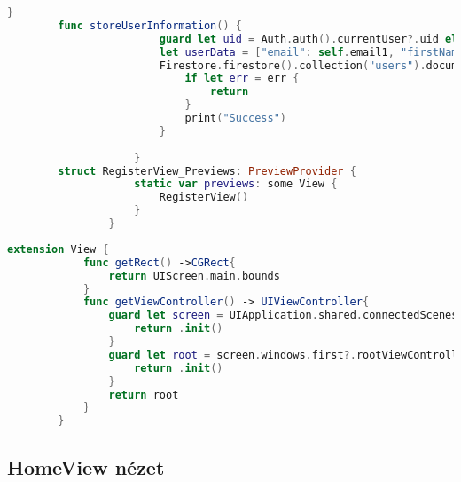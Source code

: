 \begin{minipage}{\textwidth}
\begin{lstlisting}[language=swift]
                            }
        func storeUserInformation() {
                        guard let uid = Auth.auth().currentUser?.uid else {return}
                        let userData = ["email": self.email1, "firstName": self.firstName1, "lastName": self.lastName1, "imageUrl": "imageurl", "id": uid]
                        Firestore.firestore().collection("users").document(uid).setData(userData) { err in
                            if let err = err {
                                return
                            }
                            print("Success")
                        }
                        
                    }
        struct RegisterView_Previews: PreviewProvider {
                    static var previews: some View {
                        RegisterView()
                    }
                }
    \end{lstlisting}   
\end{minipage}

\hspace{-10mm}
\begin{minipage}{\textwidth}
    \linespread{0.8}\selectfont
    \begin{lstlisting}[language=swift]
extension View {
            func getRect() ->CGRect{
                return UIScreen.main.bounds
            }
            func getViewController() -> UIViewController{
                guard let screen = UIApplication.shared.connectedScenes.first as? UIWindowScene else{
                    return .init()
                }
                guard let root = screen.windows.first?.rootViewController else{
                    return .init()
                }       
                return root
            }
        }
    \end{lstlisting}   
\end{minipage}


\subsection*{HomeView nézet}

